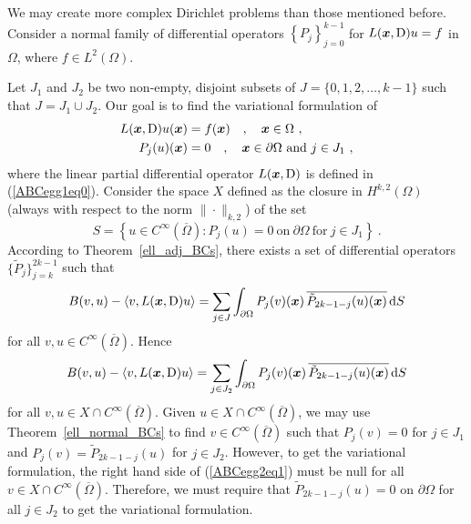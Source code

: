 \begin{egg}
We may create more complex Dirichlet problems than those mentioned
before.  Consider a normal family of differential operators 
$\displaystyle \left\{ P_j \right\}_{j=0}^{k-1}$ for
$L({\bm{x}},\operatorname{D})u = f$ in $\Omega$, where $\displaystyle f \in L^2(\Omega)$.

Let $J_1$ and $J_2$ be two non-empty, disjoint subsets of
$J=\{0,1,2,\ldots,k-1\}$ such that $J=J_1\cup J_2$.  Our goal is to
find the variational formulation of
\begin{equation} \label{ell_egg1_adj_BCs}
\begin{split}
L(\VEC{x},\diff)u(\VEC{x}) &= f(\VEC{x}) \quad , \quad \VEC{x} \in \Omega \ , \\
P_j(u)(\VEC{x}) &= 0 \quad , \quad \VEC{x} \in \partial \Omega \ \text{and}
\ j\in J_1 \ ,
\end{split}
\end{equation}
where the linear partial differential operator $L({\bm{x}},\operatorname{D})$ is
defined in (\ref{ABCegg1eq0}).
Consider the space $X$ defined as the closure in
$\displaystyle H^{k,2}(\Omega)$ (always
with respect to the norm $\|\cdot\|_{k,2}$) of the set
\[
S = \left\{ u \in C^\infty(\overline{\Omega}) : P_j(u) = 0 \ \text{on}
\ \partial \Omega \ \text{for} \ j\in J_1 \right\} \ .
\]
According to Theorem~\ref{ell_adj_BCs}, there exists a set of
differential operators $\displaystyle \{ \tilde{P}_j\}_{j=k}^{2k-1}$
such that
\[
B(v,u) - \left\langle{v} , {L({\bm{x}},\operatorname{D})u}\right\rangle =
\sum_{j\in J} \int_{\partial \Omega} P_j(v)({\bm{x}}) \,
\overline{\tilde{P}_{2k-1-j}(u)({\bm{x}})} \,\mathrm{d}{S}
\]
for all $\displaystyle v,u \in C^\infty(\overline{\Omega})$.
Hence
\begin{equation} \label{ABCegg2eq1}
B(v,u) - \left\langle{v} , {L({\bm{x}},\operatorname{D})u}\right\rangle =
\sum_{j\in J_2} \int_{\partial \Omega} P_j(v)({\bm{x}}) \,
\overline{\tilde{P}_{2k-1-j}(u)({\bm{x}})} \,\mathrm{d}{S}
\end{equation}
for all $\displaystyle v,u \in X \cap C^\infty(\overline{\Omega})$.
Given $\displaystyle u\in X \cap C^\infty(\overline{\Omega})$, we may use
Theorem~\ref{ell_normal_BCs} to find
$\displaystyle v \in C^\infty(\overline{\Omega})$ such that
$P_j(v)=0$ for $j\in J_1$ and $P_j(v) = \tilde{P}_{2k-1-j}(u)$ for $j\in J_2$.
However, to get the variational formulation, the right hand side of
(\ref{ABCegg2eq1}) must be null for all
$\displaystyle v\in X \cap C^\infty(\overline{\Omega})$.  Therefore,
we must require that $\displaystyle \tilde{P}_{2k-1-j}(u) = 0$ on
$\partial \Omega$ for all $j \in J_2$ to get the variational formulation.

\end{egg}
